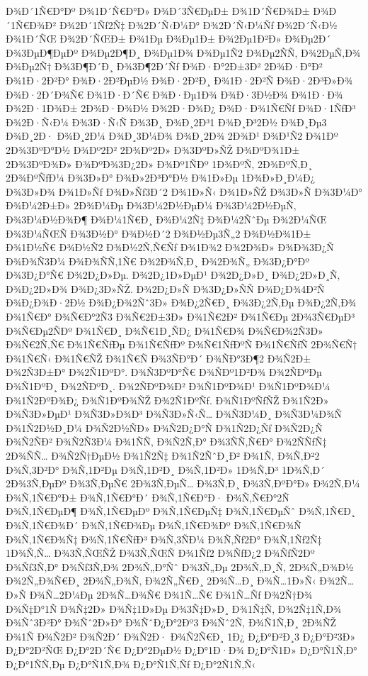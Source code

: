 {Ð¾Ð´1Ñ€Ð°Ðº
Ð¾1Ð´Ñ€Ð°Ð»
Ð¾Ð´3Ñ€ÐµÐ±
Ð¾1Ð´Ñ€Ð¾Ð±
Ð¾Ð´1Ñ€Ð¾Ð²
Ð¾2Ð´1Ñƒ2Ñ‡
Ð¾2Ð´Ñ‹Ð¼Ð°
Ð¾2Ð´Ñ‹Ð¼Ñƒ
Ð¾2Ð´Ñ‹Ð½
Ð¾1Ð´ÑŒ
Ð¾2Ð´ÑŒÐ±
Ð¾1Ðµ
Ð¾Ðµ1Ð±
Ð¾2Ðµ1Ð²Ð»
Ð¾Ðµ2Ð´
Ð¾3ÐµÐ¶ÐµÐº
Ð¾Ðµ2Ð¶Ð¸
Ð¾Ðµ1Ð¾
Ð¾Ðµ1Ñ2
Ð¾Ðµ2ÑÑ‚
Ð¾2ÐµÑ‚Ð¾
Ð¾Ðµ2Ñ†
Ð¾3Ð¶Ð´Ð¸
Ð¾3Ð¶2Ð´Ñƒ
Ð¾Ð·Ð°2Ð±3Ð²
2Ð¾Ð·Ð°Ð²
Ð¾1Ð·2Ð²Ð°
Ð¾Ð·2Ð²ÐµÐ½
Ð¾Ð·2Ð²Ð¸
Ð¾1Ð·2Ð²Ñ
Ð¾Ð·2Ð³Ð»Ð¾
Ð¾Ð·2Ð´Ð¾Ñ€
Ð¾1Ð·Ð´Ñ€
Ð¾Ð·Ðµ1Ð¾
Ð¾Ð·3Ð½Ð¾
Ð¾1Ð·Ð¾
Ð¾2Ð·1Ð¾Ð±
2Ð¾Ð·Ð¾Ð½
Ð¾2Ð·Ð¾Ð¿
Ð¾Ð·Ð¾1Ñ€Ñƒ
Ð¾Ð·1ÑƒÐ³
Ð¾2Ð·Ñ‹Ð¼
Ð¾3Ð·Ñ‹Ñ
Ð¾3Ð¸
Ð¾Ð¸2Ð³1
Ð¾Ð¸Ð³2Ð½
Ð¾Ð¸Ðµ3
Ð¾Ð¸2Ð·
Ð¾Ð¸2Ð¼
Ð¾Ð¸3Ð¼Ð¾
Ð¾Ð¸2Ð¾
2Ð¾Ð¹
Ð¾Ð¹Ñ2
Ð¾1Ðº
2Ð¾3ÐºÐ°Ð½
Ð¾Ðº2Ð²
2Ð¾Ðº2Ð»
Ð¾3ÐºÐ»ÑŽ
Ð¾ÐºÐ¾1Ð±
2Ð¾3ÐºÐ¾Ð»
Ð¾ÐºÐ¾3Ð¿2Ð»
Ð¾Ðº1ÑÐº
1Ð¾ÐºÑ‚
2Ð¾ÐºÑ‚Ð¸
2Ð¾ÐºÑƒÐ¼
Ð¾3Ð»Ð°
Ð¾Ð»2Ð³Ð°Ð½
Ð¾1Ð»Ðµ
1Ð¾Ð»Ð¸Ð¼Ð¿
Ð¾3Ð»Ð¾
Ð¾1Ð»Ñƒ
Ð¾Ð»Ñƒ3Ð´2
Ð¾1Ð»Ñ‹
Ð¾1Ð»ÑŽ
Ð¾3Ð»Ñ
Ð¾3Ð¼Ð°
Ð¾Ð¼2Ð±Ð»
2Ð¾Ð¼Ðµ
Ð¾3Ð¼2Ð½ÐµÐ¼
Ð¾3Ð¼2Ð½ÐµÑ‚
Ð¾3Ð¼Ð½Ð¾Ð¶
Ð¾Ð¼1Ñ€Ð¸
Ð¾Ð¼2Ñ‡
Ð¾Ð¼2ÑˆÐµ
Ð¾2Ð¼ÑŒ
Ð¾3Ð¼ÑŒÑ
Ð¾3Ð½Ð°
Ð¾Ð½Ð´2
Ð¾Ð½Ðµ3Ñ„2
Ð¾Ð½Ð¾1Ð±
Ð¾1Ð½Ñ€
Ð¾Ð½Ñ2
Ð¾Ð½2Ñ‚Ñ€Ñƒ
Ð¾1Ð¾2
Ð¾2Ð¾Ð»
Ð¾Ð¾3Ð¿Ñ
Ð¾Ð¾Ñ3Ð¼
Ð¾Ð¾ÑÑ‚1Ñ€
Ð¾2Ð¾Ñ‚Ð¸
Ð¾2Ð¾Ñ„
Ð¾3Ð¿Ð°Ðº
Ð¾3Ð¿Ð°Ñ€
Ð¾2Ð¿Ð»Ðµ.
Ð¾2Ð¿1Ð»ÐµÐ¹
Ð¾2Ð¿Ð»Ð¸
Ð¾Ð¿2Ð»Ð¸Ñ‚
Ð¾Ð¿2Ð»Ð¾
Ð¾Ð¿3Ð»ÑŽ.
Ð¾2Ð¿Ð»Ñ
Ð¾3Ð¿Ð»ÑÑ
Ð¾Ð¿Ð¾4Ð²Ñ
Ð¾Ð¿Ð¾Ð·2Ð½
Ð¾Ð¿Ð¾2Ñˆ3Ð»
Ð¾Ð¿2Ñ€Ð¸
Ð¾3Ð¿2Ñ‚Ðµ
Ð¾Ð¿2Ñ‚Ð¾
Ð¾1Ñ€Ð°
Ð¾Ñ€Ð°2Ñ3
Ð¾Ñ€2Ð±3Ð»
Ð¾1Ñ€2Ð²
Ð¾1Ñ€Ðµ
2Ð¾3Ñ€ÐµÐ³
Ð¾Ñ€Ðµ2ÑÐº
Ð¾1Ñ€Ð¸
Ð¾Ñ€1Ð¸ÑÐ¿
Ð¾1Ñ€Ð¾
Ð¾Ñ€Ð¾2Ñ3Ð»
Ð¾Ñ€2Ñ‚Ñ€
Ð¾1Ñ€ÑƒÐµ
Ð¾1Ñ€ÑƒÐº
Ð¾Ñ€1ÑƒÐºÑ
Ð¾1Ñ€ÑƒÑ
2Ð¾Ñ€Ñ†
Ð¾1Ñ€Ñ‹
Ð¾1Ñ€ÑŽ
Ð¾1Ñ€Ñ
Ð¾3ÑÐ°Ð´
Ð¾ÑÐ°3Ð¶2
Ð¾Ñ2Ð±
Ð¾2Ñ3Ð±Ð°
Ð¾2Ñ1ÐºÐ°.
Ð¾Ñ3ÐºÐ°Ñ€
Ð¾ÑÐº1Ð²Ð¾
Ð¾2ÑÐºÐµ
Ð¾Ñ1ÐºÐ¸
Ð¾2ÑÐºÐ¸.
Ð¾2ÑÐºÐ¾Ð²
Ð¾Ñ1ÐºÐ¾Ð¹
Ð¾Ñ1ÐºÐ¾Ð¼
Ð¾1Ñ2ÐºÐ¾Ð¿
Ð¾Ñ1ÐºÐ¾ÑŽ
Ð¾2Ñ1ÐºÑƒ.
Ð¾Ñ1ÐºÑƒÑŽ
Ð¾1Ñ2Ð»
Ð¾Ñ3Ð»ÐµÐ¹
Ð¾Ñ3Ð»Ð¾Ð³
Ð¾Ñ3Ð»Ñ‹Ñ…
Ð¾Ñ3Ð¼Ð¸
Ð¾Ñ3Ð¼Ð¾Ñ
Ð¾1Ñ2Ð½Ð¸Ð¼
Ð¾Ñ2Ð½ÑÐ»
Ð¾Ñ2Ð¿Ð°Ñ
Ð¾1Ñ2Ð¿Ñƒ
Ð¾Ñ2Ð¿Ñ
Ð¾Ñ2ÑÐ²
Ð¾Ñ2Ñ3Ð¼
Ð¾1ÑÑ‚
Ð¾Ñ2Ñ‚Ð°
Ð¾3ÑÑ‚Ñ€Ð°
Ð¾2ÑÑƒÑ‡
2Ð¾ÑÑ…
Ð¾Ñ2Ñ†ÐµÐ½
Ð¾1Ñ2Ñ‡
Ð¾1Ñ2ÑˆÐ¸Ð²
Ð¾1Ñ‚
Ð¾Ñ‚Ð²2
Ð¾Ñ‚3Ð²Ð°
Ð¾Ñ‚1Ð²Ðµ
Ð¾Ñ‚1Ð²Ð¸
Ð¾Ñ‚1Ð²Ð»
1Ð¾Ñ‚Ð³
1Ð¾Ñ‚Ð´
2Ð¾3Ñ‚ÐµÐº
Ð¾3Ñ‚ÐµÑ€
2Ð¾3Ñ‚ÐµÑ…
Ð¾3Ñ‚Ð¸
Ð¾3Ñ‚ÐºÐ°Ð»
Ð¾2Ñ‚Ð¼
Ð¾Ñ‚1Ñ€Ð°Ð±
Ð¾Ñ‚1Ñ€Ð°Ð´
Ð¾Ñ‚1Ñ€Ð°Ð·
Ð¾Ñ‚Ñ€Ð°2Ñ
Ð¾Ñ‚1Ñ€ÐµÐ¶
Ð¾Ñ‚1Ñ€ÐµÐº
Ð¾Ñ‚1Ñ€ÐµÑ‡
Ð¾Ñ‚1Ñ€ÐµÑˆ
Ð¾Ñ‚1Ñ€Ð¸
Ð¾Ñ‚1Ñ€Ð¾Ð´
Ð¾Ñ‚1Ñ€Ð¾Ðµ
Ð¾Ñ‚1Ñ€Ð¾Ðº
Ð¾Ñ‚1Ñ€Ð¾Ñ
Ð¾Ñ‚1Ñ€Ð¾Ñ‡
Ð¾Ñ‚1Ñ€ÑƒÐ³
Ð¾Ñ‚3ÑÐ¼
Ð¾Ñ‚Ñƒ2Ð°
Ð¾Ñ‚1Ñƒ2Ñ‡
1Ð¾Ñ‚Ñ…
Ð¾3Ñ‚ÑŒÑŽ
Ð¾3Ñ‚ÑŒÑ
Ð¾1Ñƒ2
Ð¾ÑƒÐ¿2
Ð¾ÑƒÑ2Ðº
Ð¾Ñƒ3Ñ‚Ð°
Ð¾Ñƒ3Ñ‚Ð¾
2Ð¾Ñ„Ð°Ñˆ
Ð¾3Ñ„Ðµ
2Ð¾Ñ„Ð¸Ñ‚
2Ð¾Ñ„Ð¾Ð½
Ð¾2Ñ„Ð¾Ñ€Ð¸
2Ð¾Ñ„Ð¾Ñ‚
Ð¾2Ñ„Ñ€Ð¸
2Ð¾Ñ…Ð¸
Ð¾Ñ…1Ð»Ñ‹
Ð¾2Ñ…Ð»Ñ
Ð¾Ñ…2Ð¼Ðµ
2Ð¾Ñ…Ð¾Ñ€
Ð¾1Ñ…Ñ€
Ð¾1Ñ…Ñƒ
Ð¾2Ñ†Ð¾
Ð¾Ñ‡Ð°1Ñ
Ð¾Ñ‡2Ð»
Ð¾Ñ‡1Ð»Ðµ
Ð¾3Ñ‡Ð»Ð¸
Ð¾1Ñ‡Ñ‚
Ð¾2Ñ‡1Ñ‚Ð¾
Ð¾Ñˆ3Ð²Ð°
Ð¾Ñˆ2Ð»Ð°
Ð¾ÑˆÐ¿Ð°2Ðº3
Ð¾Ñˆ2Ñ‚
Ð¾Ñ1Ñ‚Ð¸
2Ð¾ÑŽ
Ð¾1Ñ
Ð¾Ñ2Ð²
Ð¾Ñ2Ð´
Ð¾Ñ2Ð·
Ð¾Ñ2Ñ€Ð¸
1Ð¿
Ð¿Ð°Ð²Ð¸3
Ð¿Ð°Ð²3Ð»
Ð¿Ð°2Ð²ÑŒ
Ð¿Ð°2Ð´Ñ€
Ð¿Ð°2ÐµÐ½
Ð¿Ð°1Ð·Ð¾
Ð¿Ð°Ñ1Ð»
Ð¿Ð°Ñ1Ñ‚Ð°
Ð¿Ð°1ÑÑ‚Ðµ
Ð¿Ð°Ñ1Ñ‚Ð¾
Ð¿Ð°Ñ1Ñ‚Ñƒ
Ð¿Ð°2Ñ1Ñ‚Ñ‹
}
